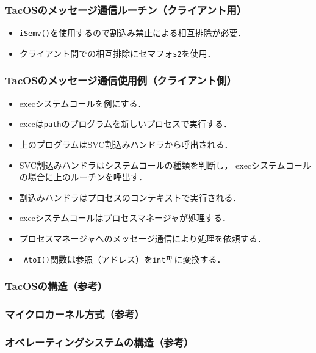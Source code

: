 \documentclass[dvipdfmx]{beamer}
\begin{document}
\begin{frame}
  \frametitle{TacOSのメッセージ通信ルーチン（クライアント用）}
  
  \begin{itemize}
  \item {\tt iSemv()}を使用するので割込み禁止による相互排除が必要．
  \item クライアント間での相互排除にセマフォ{\tt s2}を使用．
  \end{itemize}
\end{frame}

\begin{frame}
  \frametitle{TacOSのメッセージ通信使用例（クライアント側）}
  
  \begin{itemize}
  \item execシステムコールを例にする．
  \item execは{\tt path}のプログラムを新しいプロセスで実行する．
  \item 上のプログラムはSVC割込みハンドラから呼出される．
  \item SVC割込みハンドラはシステムコールの種類を判断し，
    execシステムコールの場合に上のルーチンを呼出す．
  \item 割込みハンドラはプロセスのコンテキストで実行される．
  \item execシステムコールはプロセスマネージャが処理する．
  \item プロセスマネージャへのメッセージ通信により処理を依頼する．
  \item {\tt \_AtoI()}関数は参照（アドレス）を{\tt int}型に変換する．
  \end{itemize}
\end{frame}

\begin{frame}
  \frametitle{TacOSの構造（参考）}
\end{frame}

\begin{frame}
  \frametitle{マイクロカーネル方式（参考）}
\end{frame}

\begin{frame}
  \frametitle{オペレーティングシステムの構造（参考）}
\end{frame}
\end{document}
